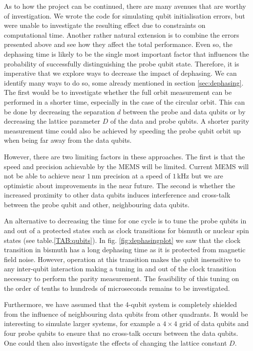 As to how the project can be continued, there are many avenues that are worthy of investigation. We wrote the code for simulating qubit initialisation errors, but were unable to investigate the resulting effect due to constraints on computational time. Another rather natural extension is to combine the errors presented above and see how they affect the total performance. Even so, the dephasing time is likely to be the single most important factor that influences the probability of successfully distinguishing the probe qubit state. Therefore, it is imperative that we explore ways to decrease the impact of dephasing. We can identify many ways to do so, some already mentioned in section \ref{sec:dephasing}. The first would be to investigate whether the full orbit measurement can be performed in a shorter time, especially in the case of the circular orbit. This can be done by decreasing the separation $d$ between the probe and data qubits or by decreasing the lattice parameter $D$ of the data and probe qubits. A shorter parity measurement time could also be achieved by speeding the probe qubit orbit up when being far away from the data qubits. 

However, there are two limiting factors in these approaches. The first is that the speed and precision achievable by the MEMS will be limited. Current MEMS will not be able to achieve near $1\, $nm precision at a speed of $1\, $kHz \cite{Koo2012,Chu2003} but we are optimistic about improvements in the near future. The second is whether the increased proximity to other data qubits induces interference and cross-talk between the probe qubit and other, neighbouring data qubits. 

An alternative to decreasing the time for one cycle is to tune the probe qubits in and out of a protected states such as clock transitions for bismuth or nuclear spin states (see table.\@ \ref{TAB:qubits}). In fig. \ref{fig:dephasingplot} we saw that the clock transition in bismuth has a long dephasing time as it is protected from magnetic field noise. However, operation at this transition makes the qubit insensitive to any inter-qubit interaction making a tuning in and out of the clock transition necessary to perform the parity measurement. The feasibility of this tuning on the order of tenths to hundreds of microseconds remains to be investigated.

Furthermore, we have assumed that the 4-qubit system is completely shielded from the influence of neighbouring data qubits from other quadrants. It would be interesting to simulate larger systems, for example a $4\times 4$ grid of data qubits and four probe qubits to ensure that no cross-talk occurs between the data qubits. One could then also investigate the effects of changing the lattice constant $D$. 

